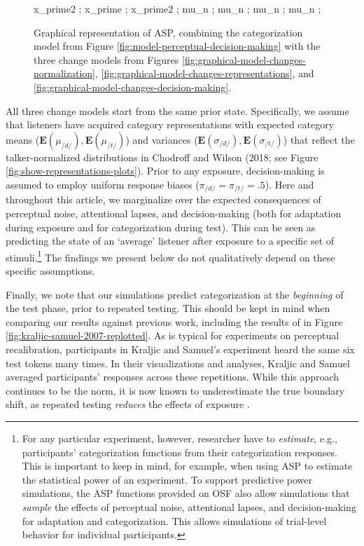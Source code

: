 \documentclass[
  11pt,
  man,floatsintext]{apa6}
\begin{document}
\begin{figure}
{%
     {x_prime2} ; %
     {x_prime} ; %
     {x_prime2} ; %
     {mu_n} ; %
     {mu_n} ; %
     {mu_n} ; %
     {mu_n} ; %
}
\caption{Graphical representation of ASP, combining the categorization model from Figure \ref{fig:model-perceptual-decision-making} with the three change models from Figures \ref{fig:graphical-model-changes-normalization}, \ref{fig:graphical-model-changes-representations}, and \ref{fig:graphical-model-changes-decision-making}.}\label{fig:graphical-model-all}
\end{figure}

All three change models start from the same prior state. Specifically, we assume that listeners have acquired category representations with expected category means (\(\mathbf{E}(\mu_{/d/}), \mathbf{E}(\mu_{/t/})\)) and variances (\(\mathbf{E}(\sigma_{/d/}), \mathbf{E}(\sigma_{/t/})\)) that reflect the talker-normalized distributions in Chodroff and Wilson (2018; see Figure \ref{fig:show-representations-plots}). Prior to any exposure, decision-making is assumed to employ uniform response biases (\(\pi_{/d/}=\pi_{/t/}=.5\)). Here and throughout this article, we marginalize over the expected consequences of perceptual noise, attentional lapses, and decision-making (both for adaptation during exposure and for categorization during test). This can be seen as predicting the state of an `average' listener after exposure to a specific set of stimuli.\footnote{For any particular experiment, however, researcher have to \emph{estimate}, e.g., participants' categorization functions from their categorization responses. This is important to keep in mind, for example, when using ASP to estimate the statistical power of an experiment. To support predictive power simulations, the ASP functions provided on OSF also allow simulations that \emph{sample} the effects of perceptual noise, attentional lapses, and decision-making for adaptation and categorization. This allows simulations of trial-level behavior for individual participants.} The findings we present below do not qualitatively depend on these specific assumptions.

Finally, we note that our simulations predict categorization at the \emph{beginning} of the test phase, prior to repeated testing. This should be kept in mind when comparing our results against previous work, including the results of \textcite{kraljic-samuel2007} in Figure \ref{fig:kraljic-samuel-2007-replotted}. As is typical for experiments on perceptual recalibration, participants in Kraljic and Samuel's experiment heard the same six test tokens many times. In their visualizations and analyses, Kraljic and Samuel averaged participants' responses across these repetitions. While this approach continues to be the norm, it is now known to underestimate the true boundary shift, as repeated testing \emph{reduces} the effects of exposure \autocites{mitterer2011-perceptual-recalibration,liu-jaeger2018,liu-jaeger2019,scharenborg-janse2013,zheng-samuel2023}[for early discussion, see][p.~11]{norris2003}.
\end{document}
